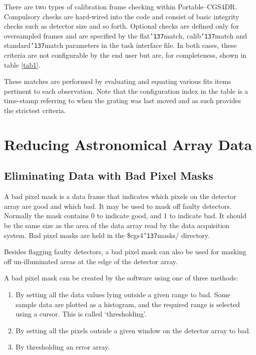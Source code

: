 \documentclass[a4paper]{book}
\newcommand{\stardocinitials}  {SUN}
\newcommand{\stardocnumber}    {27.5}
\newcommand{\stardocname}{\stardocinitials /\stardocnumber}
\renewcommand{\_}{{\tt\char'137}}
\begin{document}
There are two types of calibration frame checking within Portable--CGS4DR.
Compulsory checks are hard-wired into the code and consist of basic
integrity checks such as detector size and so forth. Optional checks are
defined only for oversampled frames and are specified by the flat\_match,
calib\_match and standard\_match parameters in the task interface file. In
both cases, these criteria are not configurable by the end user but are,
for completeness, shown in table \ref{tab1}.

These matches are performed by evaluating and equating various {\sc fits}
items pertinent to each observation. Note that the configuration index in
the table is a time-stamp referring to when the grating was last moved and
as such provides the strictest criteria.

\chapter{Reducing Astronomical Array Data}
\markboth{General DR Paradigms}{\stardocname}
\section{Eliminating Data with Bad Pixel Masks}
A bad pixel mask is a data frame that indicates which pixels on the
detector array are good and which bad. It may be used to mask off faulty
detectors. Normally the mask contains 0 to indicate good, and 1 to
indicate bad. It should be the same size as the area of the data array
read by the data acquisition system. Bad pixel masks are held in the {\sc
\$cgs4\_masks/} directory.

Besides flagging faulty detectors, a bad pixel mask can also be used for
masking off un-illuminated areas at the edge of the detector array.

A bad pixel mask can be created by the software using one of three
methods:

\begin{enumerate}
 \item By setting all the data values lying outside a given range to bad.
 Some sample data are plotted as a histogram, and the required range is
 selected using a cursor. This is called `thresholding'.
 \item By setting all the pixels outside a given window on the detector
 array to bad.
 \item By thresholding an error array.
\end{enumerate}
\end{document}
